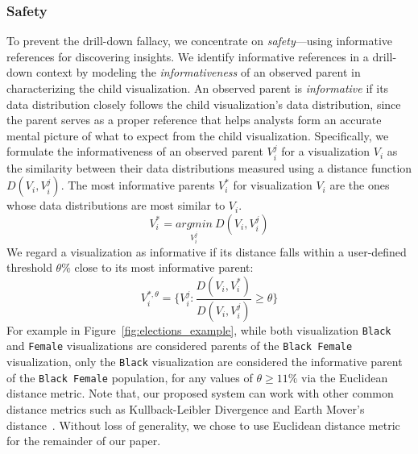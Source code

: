 \subsubsection{Safety}
To prevent the drill-down fallacy, we concentrate on \emph{safety}---using informative references for discovering insights. We identify informative references in a drill-down context by modeling the \emph{informativeness} of an observed parent in characterizing the child visualization. An observed parent is \emph{informative} if its data distribution closely follows the child visualization's data distribution, since the parent serves as a proper reference that helps analysts form an accurate mental picture of what to expect from the child visualization. Specifically, we formulate the informativeness of an observed parent $V_i^j$ for a visualization $V_i$ as the similarity between their data distributions measured using a distance function $D(V_i, V_i^j)$. The most informative parents $V_i^*$ for visualization $V_i$ are the ones whose data distributions are most similar to $V_i$.
\begin{equation}
    V_i^*=\underset{V_i^j}{argmin}\ D(V_i, V_i^j)
\end{equation}
We regard a visualization as informative if its distance falls within a user-defined threshold $\theta\%$ close to its most informative parent:
\begin{equation}
    V_i^{*, \theta} = \{V_i^j : \frac{D(V_i, V_i^*)}{D(V_i, V_i^j)} \geq \theta\}
\end{equation}
For example in Figure~\ref{fig:elections_example}, while both visualization \texttt{Black} and \texttt{Female} visualizations are considered parents of the \texttt{Black Female} visualization, only the \texttt{Black} visualization are considered the informative parent of the \texttt{Black Female} population, for any values of $\theta \geq 11\%$ via the Euclidean distance metric. Note that, our proposed system can work with other common distance metrics such as Kullback-Leibler Divergence and Earth Mover's distance~\cite{Vartak2015}. Without loss of generality, we chose to use Euclidean distance metric for the remainder of our paper.
